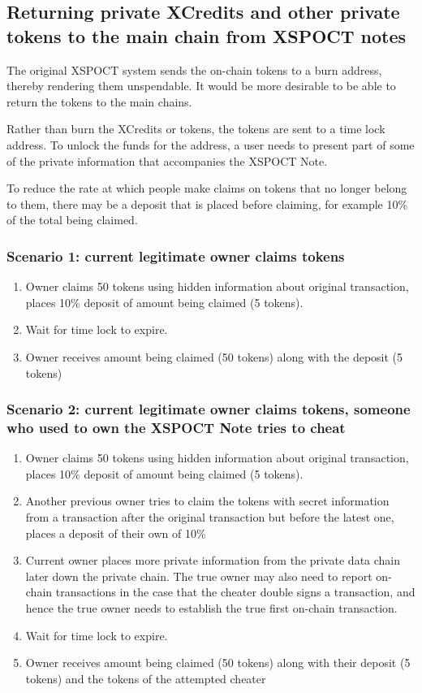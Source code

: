 \subsection{Returning private XCredits and other private tokens to the main chain from XSPOCT notes}
The original XSPOCT system sends the on-chain tokens to a burn address, thereby rendering them unspendable. It would be more desirable to be able to return the tokens to the main chains.



Rather than burn the XCredits or tokens, the tokens are sent to a time lock address. To unlock the funds for the address, a user needs to present part of some of the private information that accompanies the XSPOCT Note. 

To reduce the rate at which people make claims on tokens that no longer belong to them, there may be a deposit that is placed before claiming, for example 10\% of the total being claimed. 

\subsubsection{Scenario 1: current legitimate owner claims tokens}
\begin{enumerate}
  \item Owner claims 50 tokens using hidden information about original transaction, places 10\% deposit of amount being claimed (5 tokens). 
  \item Wait for time lock to expire. 
  \item Owner receives amount being claimed (50 tokens) along with the deposit (5 tokens)
\end{enumerate}

\subsubsection{Scenario 2: current legitimate owner claims tokens, someone who used to own the XSPOCT Note tries to cheat}
\begin{enumerate}
  \item Owner claims 50 tokens using hidden information about original transaction, places 10\% deposit of amount being claimed (5 tokens).
  \item Another previous owner tries to claim the tokens with secret information from a transaction after the original transaction but before the latest one, places a deposit of their own of 10\%
  \item Current owner places more private information from the private data chain later down the private chain. The true owner may also need to report on-chain transactions in the case that the cheater double signs a transaction, and hence the true owner needs to establish the true first on-chain transaction.
  \item Wait for time lock to expire. 
  \item Owner receives amount being claimed (50 tokens) along with their deposit (5 tokens) and the tokens of the attempted cheater
\end{enumerate}

